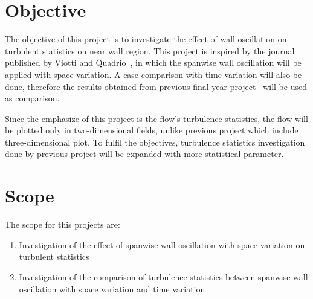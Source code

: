 \section{Objective}
The objective of this project is to investigate the effect of wall oscillation on turbulent statistics on near wall region. This project is inspired by the journal published by Viotti and Quadrio~\cite{viotti}, in which the spanwise wall oscillation will be applied with space variation. A case comparison with time variation will also be done, therefore the results obtained from previous final year project~\cite{indra} will be used as comparison.

Since the emphasize of this project is the flow's turbulence statistics, the flow will be plotted only in two-dimensional fields, unlike previous project which include three-dimensional plot. To fulfil the objectives, turbulence statistics investigation done by previous project will be expanded with more statistical parameter.

\section{Scope}
The scope for this projects are:
\begin{enumerate}
\item Investigation of the effect of spanwise wall oscillation with space variation on turbulent statistics
\item Investigation of the comparison of turbulence statistics between spanwise wall oscillation with space variation and time variation
\end{enumerate}
